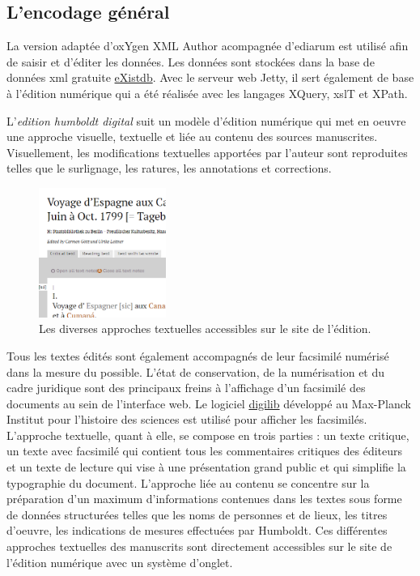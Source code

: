 \documentclass[a4paper, 12pt, twoside]{book}
\begin{document}
\subsection{L'encodage général}
La version adaptée d'oxYgen XML Author acompagnée d'ediarum est utilisé afin de saisir et d'éditer les données. Les données sont stockées dans la base de données \gls{xml} gratuite \href{http://www.exist-db.org/exist/apps/homepage/index.html}{eXistdb}. Avec le serveur web Jetty, il sert également de base à l'édition numérique qui a été réalisée avec les langages XQuery, \gls{xsl}T et XPath. 

L'\textit{edition humboldt digital} suit un modèle d'édition numérique qui met en oeuvre une approche visuelle, textuelle et liée au contenu des sources manuscrites. Visuellement, les modifications textuelles apportées par l'auteur sont reproduites telles que le surlignage, les ratures, les annotations et corrections. 

\begin{figure}
\centering
\includegraphics[width=0.37\textwidth]{img/edition_ongletslecture.png}
\caption{Les diverses approches textuelles accessibles sur le site de l'édition. }
\vspace{-10pt}
\end{figure}
Tous les textes édités sont également accompagnés de leur facsimilé numérisé dans la mesure du possible. L'état de conservation, de la numérisation et du cadre juridique sont des principaux freins à l'affichage d'un facsimilé des documents au sein de l'interface web. Le logiciel \href{https://robcast.github.io/digilib/}{digilib} développé au Max-Planck Institut pour l'histoire des sciences est utilisé pour afficher les facsimilés. L'approche textuelle, quant à elle, se compose en trois parties : un texte critique, un texte avec facsimilé qui contient tous les commentaires critiques des éditeurs et un texte de lecture qui vise à une présentation grand public et qui simplifie la typographie du document. L'approche liée au contenu se concentre sur la préparation d'un maximum d'informations contenues dans les textes sous forme de données structurées telles que les noms de personnes et de lieux, les titres d'oeuvre, les indications de mesures effectuées par Humboldt. Ces différentes approches textuelles des manuscrits sont directement accessibles sur le site de l'édition numérique avec un système d'onglet.
\end{document}
